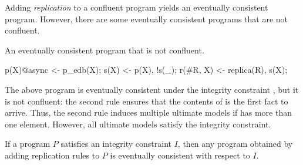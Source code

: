 Adding {\em replication}  to a confluent program yields an eventually consistent program.  However, there are some eventually consistent programs that are not confluent.

\begin{example}
An eventually consistent program that is not confluent.

\begin{Dedalus}
p(X)@async <- p_edb(X);
s(X) <- p(X), !s(_);
r(#R, X) <- replica(R), s(X);
\end{Dedalus}
\end{example}

The above program is eventually consistent under the integrity constraint , but it is not confluent: the second rule ensures that the contents of  is the first  fact to arrive.  Thus, the second rule induces multiple ultimate models if  has more than one element.  However, all ultimate models satisfy the integrity constraint.

\begin{lemma}
If a program $P$ satisfies an integrity constraint $I$, then any program obtained by adding replication rules to $P$ is eventually consistent with respect to $I$.
\end{lemma}

